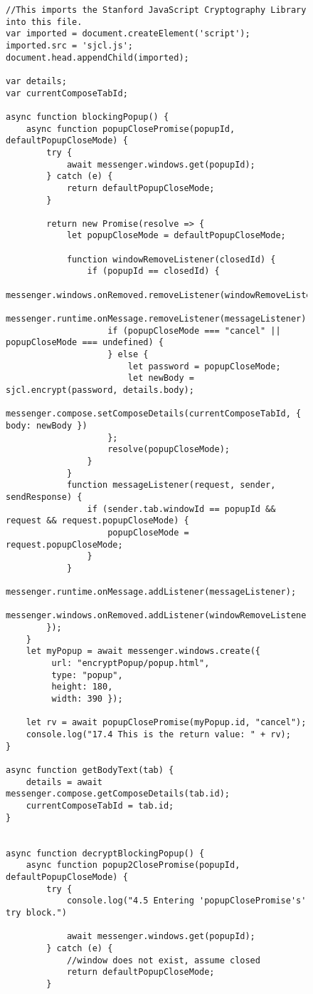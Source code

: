 
\begin{figure}[H]
\centering
\begin{verbatim}
//This imports the Stanford JavaScript Cryptography Library into this file.
var imported = document.createElement('script');
imported.src = 'sjcl.js';
document.head.appendChild(imported);

var details;
var currentComposeTabId;

async function blockingPopup() {
	async function popupClosePromise(popupId, defaultPopupCloseMode) {
		try {
			await messenger.windows.get(popupId);
		} catch (e) {
			return defaultPopupCloseMode;
		}

		return new Promise(resolve => {
			let popupCloseMode = defaultPopupCloseMode;
			
			function windowRemoveListener(closedId) {
				if (popupId == closedId) {
					messenger.windows.onRemoved.removeListener(windowRemoveListener);
					messenger.runtime.onMessage.removeListener(messageListener);
					if (popupCloseMode === "cancel" || popupCloseMode === undefined) {
					} else {
						let password = popupCloseMode;
						let newBody = sjcl.encrypt(password, details.body);
						messenger.compose.setComposeDetails(currentComposeTabId, { body: newBody })
					};
					resolve(popupCloseMode);
				}
			}
			function messageListener(request, sender, sendResponse) {
				if (sender.tab.windowId == popupId && request && request.popupCloseMode) {
					popupCloseMode = request.popupCloseMode;
				}
			}
			messenger.runtime.onMessage.addListener(messageListener);
			messenger.windows.onRemoved.addListener(windowRemoveListener);
		});
	}
	let myPopup = await messenger.windows.create({
		 url: "encryptPopup/popup.html",
		 type: "popup",
		 height: 180,
		 width: 390 });
	
	let rv = await popupClosePromise(myPopup.id, "cancel");
	console.log("17.4 This is the return value: " + rv);
}

async function getBodyText(tab) {
	details = await messenger.compose.getComposeDetails(tab.id);
	currentComposeTabId = tab.id;
}


async function decryptBlockingPopup() {
	async function popup2ClosePromise(popupId, defaultPopupCloseMode) {
		try {
			console.log("4.5 Entering 'popupClosePromise's' try block.")
			
			await messenger.windows.get(popupId);
		} catch (e) {
			//window does not exist, assume closed
			return defaultPopupCloseMode;
		}


\end{verbatim}
\end{figure}

